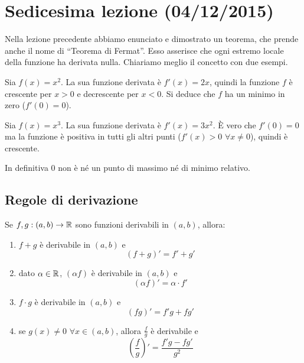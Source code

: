 \chapter{Sedicesima lezione (04/12/2015)}

Nella lezione precedente abbiamo enunciato e dimostrato un teorema, che prende anche il nome di ``Teorema di Fermat''. Esso asserisce che ogni estremo locale della funzione ha derivata nulla. Chiariamo meglio il concetto con due esempi.

\begin{example}
Sia $f(x) = x^2$. La sua funzione derivata è $f'(x) = 2x$, quindi la funzione $f$ è crescente per $x > 0$ e decrescente per $x < 0$. Si deduce che $f$ ha un minimo in zero ($f'(0) = 0$).
\end{example}

\begin{example}
Sia $f(x) = x^3$. La sua funzione derivata è $f'(x) = 3x^2$. È vero che $f'(0) = 0$ ma la funzione è positiva in tutti gli altri punti ($f'(x) > 0$ $\forall x \neq 0$), quindi è crescente. 

In definitiva 0 non è né un punto di massimo né di minimo relativo.
\end{example}

\section{Regole di derivazione}

\begin{theorem}
Se $f, g : (a, b) \to \mathbb R$ sono funzioni derivabili in $(a, b)$, allora:
\begin{enumerate}
\item $f+g$ è derivabile in $(a, b)$ e 
\begin{equation*}
(f+g)' = f'+g'
\end{equation*}
\item dato $\alpha \in \mathbb R$, $(\alpha f)$ è derivabile in $(a,b)$ e 
\begin{equation*}
(\alpha f)' = \alpha \cdot f'
\end{equation*}
\item $f\cdot g$ è derivabile in $(a, b)$ e 
\begin{equation*}
(fg)' = f'g + fg'
\end{equation*}
\item se $g(x) \neq 0$ $\forall x \in (a,b)$, allora $\frac{f}{g}$ è derivabile e
\begin{equation*}
\left( \frac{f}{g} \right)' = \frac{f'g - fg'}{g^2}
\end{equation*}
\end{enumerate}
\end{theorem}

